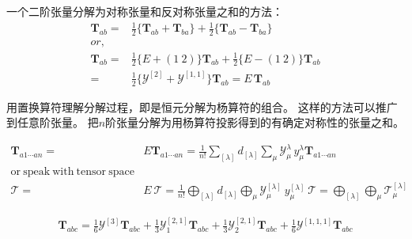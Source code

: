 \begin{example}[二阶张量分解]
一个二阶张量分解为对称张量和反对称张量之和的方法：
\begin{equation}\begin{aligned}
\label{eq.8.1.6}
\mathbf{T}_{ab}={}&\frac{1}{2}\{\mathbf{T}_{ab}+\mathbf{T}_{ba}\}+
\frac{1}{2}\{\mathbf{T}_{ab}-\mathbf{T}_{ba}\}\\
or,\\
\mathbf{T}_{ab}={}&\frac{1}{2}\{E+(1~2)\}\mathbf{T}_{ab}+
\frac{1}{2}\{E-(1~2)\}\mathbf{T}_{ab}\\
{}={}&\frac{1}{2}\{\mathcal{Y}^{[2]}+\mathcal{Y}^{[1,1]}\}\mathbf{T}_{ab}
=E\,\mathbf{T}_{ab}
\end{aligned}\end{equation}
\end{example}

用置换算符理解分解过程，即是恒元分解为杨算符的组合。
这样的方法可以推广到任意阶张量。
把$n$阶张量分解为用杨算符投影得到的有确定对称性的张量之和。

\begin{newprop}[张量分解]
\begin{equation}\begin{aligned}
\label{eq.8.1.7}
\mathbf{T}_{a1\cdots an}={}&
E \mathbf{T}_{a1\cdots an}=
\frac{1}{n!}\sum\limits_{[\lambda]} d_{[\lambda]}
\sum\limits_{\mu} 
\mathcal{Y}_\mu^{\lambda}\,
y_\mu^{\lambda}
\mathbf{T}_{a1\cdots an}\\
\mathrm{or~speak~with~tensor~space} \\
\mathcal{T}={}&
E~\mathcal{T}=
\frac{1}{n!}
\bigoplus\limits_{[\lambda]} d_{[\lambda]}
\bigoplus\limits_{\mu} 
\mathcal{Y}_\mu^{[\lambda]}~
y_\mu^{[\lambda]}~\mathcal{T}=
\bigoplus\limits_{[\lambda]}
\bigoplus\limits_{\mu}
\mathcal{T}_\mu^{[\lambda]}
\end{aligned}\end{equation}
\end{newprop}

\begin{example}[3阶张量分解]
\begin{equation}\begin{aligned}
\label{eq.8.1.8}
\mathbf{T}_{abc}=	
\frac{1}{6} \mathcal{Y}^{[3]}	\mathbf{T}_{abc}+
\frac{1}{3} \mathcal{Y}^{[2,1]}_1	\mathbf{T}_{abc}+
\frac{1}{3} \mathcal{Y}^{[2,1]}_2	\mathbf{T}_{abc}+	
\frac{1}{6} \mathcal{Y}^{[1,1,1]}	\mathbf{T}_{abc}
\end{aligned}\end{equation}
\end{example}
























